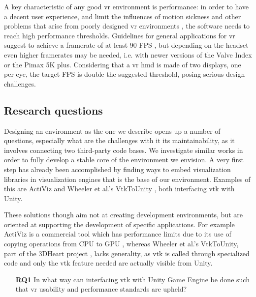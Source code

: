 A key characteristic of any good \acrshort{vr} environment is performance: in order to have a decent user experience, and limit the influences of motion sickness and other problems that arise from poorly designed \acrshort{vr} environments \cite{viire1997health}, the software needs to reach high performance thresholds. Guidelines for general applications for \acrshort{vr} suggest to achieve a framerate of at least 90 FPS \cite{unity_vr_2020}, but depending on the headset even higher framerates may be needed, i.e. with newer versions of the Valve Index or the Pimax 5K plus. Considering that a \acrshort{vr} \acrfull{hmd} is made of two displays, one per eye, the target FPS is double the suggested threshold, posing serious design challenges.

\subsection{Research questions}

Designing an environment as the one we describe opens up a number of questions, especially what are the challenges with it its maintainability, as it involves connecting two third-party code bases. We investigate similar works in order to fully develop a stable core of the environment we envision. A very first step has already been accomplished by finding ways to embed visualization libraries in visualization engines that is the base of our environment. Examples of this are ActiViz \cite{kitware_activiz} and Wheeler et al.'s VtkToUnity \cite{wheeler_virtual_2018}, both interfacing \acrshort{vtk} with Unity.

These solutions though aim not at creating development environments, but are oriented at supporting the development of specific applications. For example ActiViz is a commercial tool which has performance limits due to its use of copying operations from CPU to GPU \cite{gregg2011data}, whereas Wheeler et al.'s VtkToUnity, part of the 3DHeart project \cite{wheeler_virtual_2018}, lacks generality, as \acrshort{vtk} is called through specialized code and only the \acrshort{vtk} feature needed are actually visible from Unity.

\begin{itemize}[leftmargin=1.5truecm]
    \item[\textbf{RQ1}] In what way can interfacing \acrlong{vtk} with Unity Game Engine be done such that \acrshort{vr} usability and performance standards are upheld?
\end{itemize}

